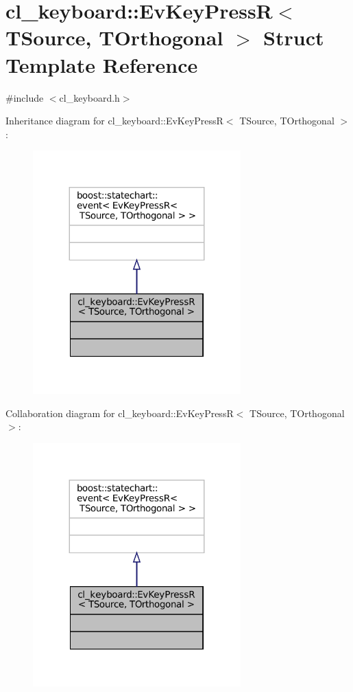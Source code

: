 \hypertarget{structcl__keyboard_1_1EvKeyPressR}{}\section{cl\+\_\+keyboard\+:\+:Ev\+Key\+PressR$<$ T\+Source, T\+Orthogonal $>$ Struct Template Reference}
\label{structcl__keyboard_1_1EvKeyPressR}


{\ttfamily \#include $<$cl\+\_\+keyboard.\+h$>$}



Inheritance diagram for cl\+\_\+keyboard\+:\+:Ev\+Key\+PressR$<$ T\+Source, T\+Orthogonal $>$\+:
\nopagebreak
\begin{figure}[H]
\begin{center}
\leavevmode
\includegraphics[width=227pt]{structcl__keyboard_1_1EvKeyPressR__inherit__graph}
\end{center}
\end{figure}


Collaboration diagram for cl\+\_\+keyboard\+:\+:Ev\+Key\+PressR$<$ T\+Source, T\+Orthogonal $>$\+:
\nopagebreak
\begin{figure}[H]
\begin{center}
\leavevmode
\includegraphics[width=227pt]{structcl__keyboard_1_1EvKeyPressR__coll__graph}
\end{center}
\end{figure}


